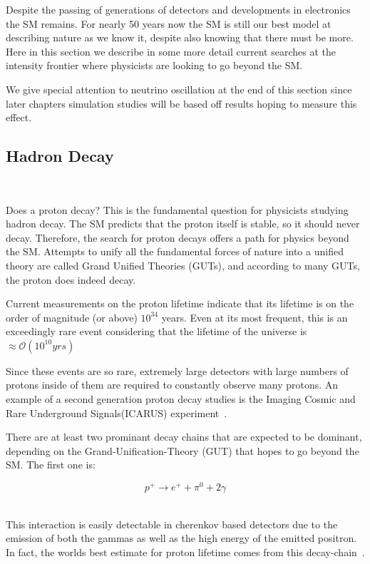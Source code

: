 Despite the passing of generations of detectors and developments in electronics the SM remains.
For nearly 50 years now the SM is still our best model at describing nature as we know it, despite also knowing that there must be more.
Here in this section we describe in some more detail current searches at the intensity frontier where physicists are looking to go beyond the SM.

We give special attention to neutrino oscillation at the end of this section since later chapters simulation studies will be based off results hoping to measure this effect.

\subsection{Hadron Decay}~\label{sec:hadron_decay}

Does a proton decay?
This is the fundamental question for physicists studying hadron decay.
The SM predicts that the proton itself is stable, so it should never decay.
Therefore, the search for proton decays offers a path for physics beyond the SM.
Attempts to unify all the fundamental forces of nature into a unified theory are called Grand Unified Theories (GUTs), and according to many GUTs, the proton does indeed decay.

Current measurements on the proton lifetime indicate that its lifetime is on the order of magnitude (or above) $10^{34}$ years.
Even at its most frequent, this is an exceedingly rare event considering that the lifetime of the universe is $\approx \mathcal{O}(10^{10} yrs)$

Since these events are so rare, extremely large detectors with large numbers of protons inside of them are required to constantly observe many protons.
An example of a second generation proton decay studies is the Imaging Cosmic and Rare Underground Signals(ICARUS) experiment~\citep{ICARUS_2001}.

There are at least two prominant decay chains that are expected to be dominant, depending on the Grand-Unification-Theory (GUT) that hopes to go beyond the SM.
The first one is:

\begin{equation}
  p^{+} \rightarrow e^{+} + \pi^{0} + 2 \gamma
\end{equation}
~\label{eq:rxn_proton_decay1}

This interaction is easily detectable in cherenkov based detectors due to the emission of both the gammas as well as the high energy of the emitted positron.
In fact, the worlds best estimate for proton lifetime comes from this decay-chain~\citep{PhysRevD.95.012004}.

